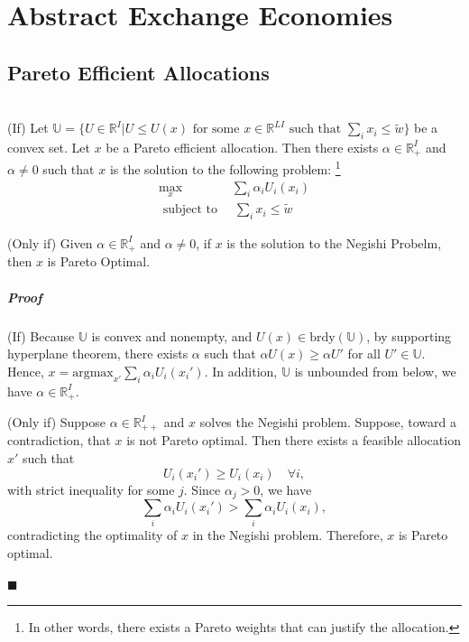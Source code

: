 \chapter{Abstract Exchange Economies}
\section{Pareto Efficient Allocations}
\begin{proposition} 
\\
\noindent (If) Let $\mathbb{U} = \{U \in \mathbb{R}^I | U \leq U(x) \text{ for some } x \in \mathbb{R}^{LI} \text{ such that } \sum_i x_i \leq \tilde{w} \}$
be a convex set. 
Let $x$ be a Pareto efficient allocation. 
Then there exists $\alpha \in \mathbb{R}_{+}^I$ and $\alpha \neq 0$ such that $x$ is the solution to the following problem:%
\footnote{
    In other words, there exists a Pareto weights that can justify the allocation.
}
\begin{align*}
    \max_x \ & \sum_i \alpha_i U_i(x_i) \\ 
    \text{ subject to } & \ \sum_i x_i \leq \tilde{w}
\end{align*}

\noindent (Only if) Given $\alpha \in \mathbb{R}_{+}^I$ and $\alpha \neq 0$, if $x$ is the solution to the Negishi Probelm, 
then $x$ is Pareto Optimal.
\end{proposition}

\paragraph{Proof}
(If) 
Because $\mathbb{U}$ is convex and nonempty, and $U(x) \in \text{brdy}(\mathbb{U})$,
by supporting hyperplane theorem, there exists $\alpha$ such that 
$\alpha U(x) \geq \alpha U'$ for all $U' \in \mathbb{U}$.
Hence, $x = \text{argmax}_{x'} \sum_i \alpha_i U_i(x_i')$. 
In addition, $\mathbb{U}$ is unbounded from below, we have $\alpha \in \mathbb{R}^I_+$. 


(Only if) Suppose $\alpha \in \mathbb R^I_{++}$ and $x$ solves the Negishi problem. 
Suppose, toward a contradiction, that $x$ is not Pareto optimal. Then there exists a feasible allocation $x'$ such that
\[
U_i(x_i') \geq U_i(x_i)\quad \forall i,
\]
with strict inequality for some $j$. Since $\alpha_j>0$, we have
\[
\sum_i \alpha_i U_i(x_i')
>
\sum_i \alpha_i U_i(x_i),
\]
contradicting the optimality of $x$ in the Negishi problem. Therefore, $x$ is Pareto optimal.

\(\blacksquare\)


